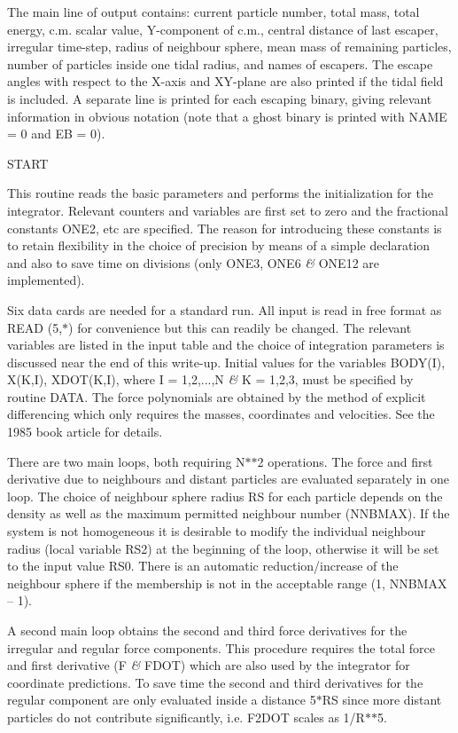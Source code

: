  The main line of output contains: current particle number, total mass, total
 energy, c.m. scalar value, Y-component of c.m., central distance of last
 escaper, irregular time-step, radius of neighbour sphere, mean mass of
 remaining particles, number of particles inside one tidal radius, and names of
 escapers.  The escape angles with respect to the X-axis and XY-plane are also
 printed if the tidal field is included.
 A separate line is printed for each escaping binary, giving 
 relevant information in obvious notation (note that a ghost
 binary is printed with NAME = 0 and EB = 0).
\bigskip
\bigskip
\centerline {START}
\bigskip

 This routine reads the basic parameters and performs the initialization for
 the integrator.  Relevant counters and variables are first set to zero and the
 fractional constants ONE2, etc are specified.  The reason for introducing these
  constants is to retain flexibility in the choice of precision by means of a
 simple declaration and also to save time on divisions (only ONE3, ONE6 {\it\&} ONE12
 are implemented).

 Six data cards are needed for a standard run.  All input is read
 in free format as READ (5,$\ast$) for convenience but this can readily be
 changed.  The relevant variables are
 listed in the input table and the choice of integration parameters is
 discussed near the end of this write-up.  Initial values for the variables
 BODY(I), X(K,I), XDOT(K,I), where I = 1,2,...,N {\it\&} K = 1,2,3, must be specified
 by routine DATA.  The force polynomials are obtained by the method of
 explicit differencing which only requires the masses, coordinates and
 velocities.  See the 1985 book article for details.

 There are two main loops, both
 requiring N$\ast$$\ast$2 operations.  The force and first derivative due to neighbours
 and distant particles are evaluated separately in one loop.  The choice of
 neighbour sphere radius RS for each particle depends on the density as well as
 the maximum permitted neighbour number (NNBMAX).  If the system is not
 homogeneous it is desirable to modify the individual neighbour
 radius (local variable RS2) at the beginning of the loop, otherwise it will be
 set to the input value RS0.  There is an automatic
 reduction/increase of the neighbour sphere if the membership is not in
 the acceptable range (1, NNBMAX -- 1).

 A second main loop obtains the second and third force derivatives for the
 irregular and regular force components.  This procedure requires the total
 force and first derivative (F {\it\&} FDOT) which are also used by the integrator for
 coordinate predictions.  To save time the second and third derivatives for
 the regular component are only evaluated inside a distance 5$\ast$RS since more 
 distant particles do not contribute significantly, i.e. F2DOT scales as
 1/R$\ast$$\ast$5.

